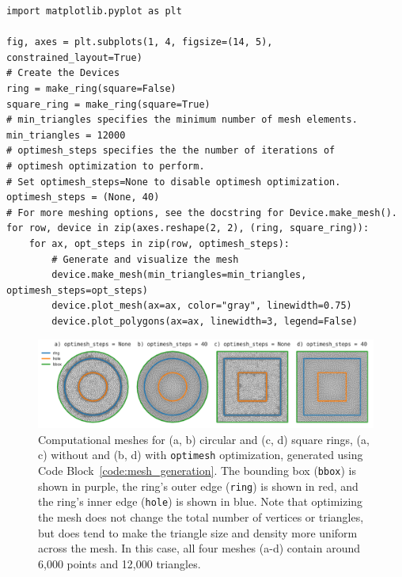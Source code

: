 \documentclass[final,3p,times]{elsarticle}
\newcommand{\inline}[1]{\texttt{#1}\xspace}
\newenvironment{code}{\captionsetup{type=listing}}{\hfill}
\begin{document}
\begin{code}
\begin{verbatim}
import matplotlib.pyplot as plt

fig, axes = plt.subplots(1, 4, figsize=(14, 5), constrained_layout=True)
# Create the Devices
ring = make_ring(square=False)
square_ring = make_ring(square=True)
# min_triangles specifies the minimum number of mesh elements.
min_triangles = 12000
# optimesh_steps specifies the the number of iterations of
# optimesh optimization to perform.
# Set optimesh_steps=None to disable optimesh optimization.
optimesh_steps = (None, 40)
# For more meshing options, see the docstring for Device.make_mesh().
for row, device in zip(axes.reshape(2, 2), (ring, square_ring)):
    for ax, opt_steps in zip(row, optimesh_steps):
        # Generate and visualize the mesh
        device.make_mesh(min_triangles=min_triangles, optimesh_steps=opt_steps)
        device.plot_mesh(ax=ax, color="gray", linewidth=0.75)
        device.plot_polygons(ax=ax, linewidth=3, legend=False)
\end{verbatim}
\label{code:mesh_generation}
\end{code}

\begin{figure}[h]
    \centering
    \includegraphics[width=\textwidth]{examples/images/mesh.pdf}
    \caption{Computational meshes for (a, b) circular and (c, d) square rings, (a, c) without and (b, d) with \inline{optimesh} optimization, generated using Code Block~\ref{code:mesh_generation}. The bounding box (\inline{bbox}) is shown in purple, the ring's outer edge (\inline{ring}) is shown in red, and the ring's inner edge (\inline{hole}) is shown in blue. Note that optimizing the mesh does not change the total number of vertices or triangles, but does tend to make the triangle size and density more uniform across the mesh. In this case, all four meshes (a-d) contain around 6,000 points and 12,000 triangles.}
    \label{fig:mesh}
\end{figure}
\end{document}
